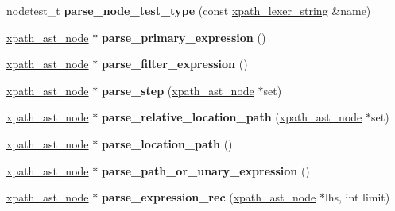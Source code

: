 \begin{DoxyCompactItemize}
\item 
\hypertarget{structxpath__parser_a7b4555d7bfdb90971333c46963d5d791}{nodetest\+\_\+t {\bfseries parse\+\_\+node\+\_\+test\+\_\+type} (const \hyperlink{structxpath__lexer__string}{xpath\+\_\+lexer\+\_\+string} \&name)}\label{structxpath__parser_a7b4555d7bfdb90971333c46963d5d791}

\item 
\hypertarget{structxpath__parser_a320728b83e426c4874066d633ffe65d9}{\hyperlink{classxpath__ast__node}{xpath\+\_\+ast\+\_\+node} $\ast$ {\bfseries parse\+\_\+primary\+\_\+expression} ()}\label{structxpath__parser_a320728b83e426c4874066d633ffe65d9}

\item 
\hypertarget{structxpath__parser_a0530aefc1445c4eac4614e895dd0a219}{\hyperlink{classxpath__ast__node}{xpath\+\_\+ast\+\_\+node} $\ast$ {\bfseries parse\+\_\+filter\+\_\+expression} ()}\label{structxpath__parser_a0530aefc1445c4eac4614e895dd0a219}

\item 
\hypertarget{structxpath__parser_a7daf146822e199d8ad564be25daa49db}{\hyperlink{classxpath__ast__node}{xpath\+\_\+ast\+\_\+node} $\ast$ {\bfseries parse\+\_\+step} (\hyperlink{classxpath__ast__node}{xpath\+\_\+ast\+\_\+node} $\ast$set)}\label{structxpath__parser_a7daf146822e199d8ad564be25daa49db}

\item 
\hypertarget{structxpath__parser_ab50d8b75f78b7e2eb77a1cf6872daa00}{\hyperlink{classxpath__ast__node}{xpath\+\_\+ast\+\_\+node} $\ast$ {\bfseries parse\+\_\+relative\+\_\+location\+\_\+path} (\hyperlink{classxpath__ast__node}{xpath\+\_\+ast\+\_\+node} $\ast$set)}\label{structxpath__parser_ab50d8b75f78b7e2eb77a1cf6872daa00}

\item 
\hypertarget{structxpath__parser_aae61a2931ba0b0c713b5d043f1cef6d4}{\hyperlink{classxpath__ast__node}{xpath\+\_\+ast\+\_\+node} $\ast$ {\bfseries parse\+\_\+location\+\_\+path} ()}\label{structxpath__parser_aae61a2931ba0b0c713b5d043f1cef6d4}

\item 
\hypertarget{structxpath__parser_a9f5cab421e931c46b0598ecec60c5591}{\hyperlink{classxpath__ast__node}{xpath\+\_\+ast\+\_\+node} $\ast$ {\bfseries parse\+\_\+path\+\_\+or\+\_\+unary\+\_\+expression} ()}\label{structxpath__parser_a9f5cab421e931c46b0598ecec60c5591}

\item 
\hypertarget{structxpath__parser_adfd2ab26b101a03ed79d7c3041539115}{\hyperlink{classxpath__ast__node}{xpath\+\_\+ast\+\_\+node} $\ast$ {\bfseries parse\+\_\+expression\+\_\+rec} (\hyperlink{classxpath__ast__node}{xpath\+\_\+ast\+\_\+node} $\ast$lhs, int limit)}\label{structxpath__parser_adfd2ab26b101a03ed79d7c3041539115}


\end{DoxyCompactItemize}
